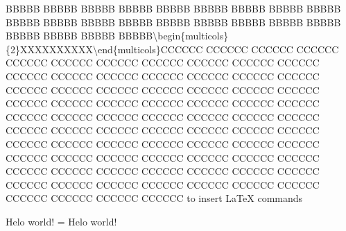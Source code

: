 BBBBB BBBBB BBBBB BBBBB BBBBB BBBBB BBBBB BBBBB BBBBB BBBBB BBBBB BBBBB BBBBB BBBBB BBBBB BBBBB BBBBB BBBBB BBBBB BBBBB BBBBB
BBBBB\textbackslash{}begin\{multicols\}\{2\}XXXXXXXXXX\textbackslash{}end\{multicols\}CCCCCC CCCCCC CCCCCC CCCCCC CCCCCC CCCCCC CCCCCC CCCCCC CCCCCC CCCCCC
CCCCCC CCCCCC CCCCCC CCCCCC CCCCCC CCCCCC CCCCCC CCCCCC CCCCCC CCCCCC CCCCCC CCCCCC CCCCCC CCCCCC CCCCCC CCCCCC CCCCCC
CCCCCC CCCCCC CCCCCC CCCCCC CCCCCC CCCCCC CCCCCC CCCCCC CCCCCC CCCCCC CCCCCC CCCCCC CCCCCC CCCCCC CCCCCC CCCCCC CCCCCC
CCCCCC CCCCCC CCCCCC CCCCCC CCCCCC CCCCCC CCCCCC CCCCCC CCCCCC CCCCCC CCCCCC CCCCCC CCCCCC CCCCCC CCCCCC CCCCCC CCCCCC
CCCCCC CCCCCC CCCCCC CCCCCC CCCCCC CCCCCC CCCCCC CCCCCC CCCCCC CCCCCC CCCCCC CCCCCC CCCCCC CCCCCC CCCCCC CCCCCC CCCCCC
to insert LaTeX commands
\mktsShowpar\par
\begin{multicols}{2}
\end{multicols}Helo {\mktsStyleCode{}world}! = Helo {\mktsStyleCode{}world}!\mktsShowpar\par

